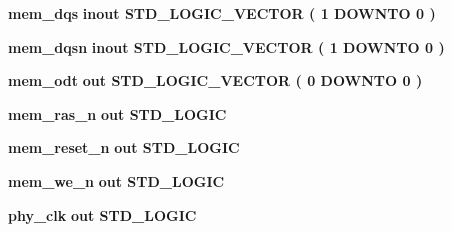 \begin{DoxyCompactItemize}
\item 
{\bf mem\+\_\+dqs}  {\bfseries {\bfseries \textcolor{keywordflow}{inout}\textcolor{vhdlchar}{ }}} {\bfseries \textcolor{comment}{S\+T\+D\+\_\+\+L\+O\+G\+I\+C\+\_\+\+V\+E\+C\+T\+OR}\textcolor{vhdlchar}{ }\textcolor{vhdlchar}{(}\textcolor{vhdlchar}{ }\textcolor{vhdlchar}{ } \textcolor{vhdldigit}{1} \textcolor{vhdlchar}{ }\textcolor{keywordflow}{D\+O\+W\+N\+TO}\textcolor{vhdlchar}{ }\textcolor{vhdlchar}{ } \textcolor{vhdldigit}{0} \textcolor{vhdlchar}{ }\textcolor{vhdlchar}{)}\textcolor{vhdlchar}{ }} 
\item 
{\bf mem\+\_\+dqsn}  {\bfseries {\bfseries \textcolor{keywordflow}{inout}\textcolor{vhdlchar}{ }}} {\bfseries \textcolor{comment}{S\+T\+D\+\_\+\+L\+O\+G\+I\+C\+\_\+\+V\+E\+C\+T\+OR}\textcolor{vhdlchar}{ }\textcolor{vhdlchar}{(}\textcolor{vhdlchar}{ }\textcolor{vhdlchar}{ } \textcolor{vhdldigit}{1} \textcolor{vhdlchar}{ }\textcolor{keywordflow}{D\+O\+W\+N\+TO}\textcolor{vhdlchar}{ }\textcolor{vhdlchar}{ } \textcolor{vhdldigit}{0} \textcolor{vhdlchar}{ }\textcolor{vhdlchar}{)}\textcolor{vhdlchar}{ }} 
\item 
{\bf mem\+\_\+odt}  {\bfseries {\bfseries \textcolor{keywordflow}{out}\textcolor{vhdlchar}{ }}} {\bfseries \textcolor{comment}{S\+T\+D\+\_\+\+L\+O\+G\+I\+C\+\_\+\+V\+E\+C\+T\+OR}\textcolor{vhdlchar}{ }\textcolor{vhdlchar}{(}\textcolor{vhdlchar}{ }\textcolor{vhdlchar}{ } \textcolor{vhdldigit}{0} \textcolor{vhdlchar}{ }\textcolor{keywordflow}{D\+O\+W\+N\+TO}\textcolor{vhdlchar}{ }\textcolor{vhdlchar}{ } \textcolor{vhdldigit}{0} \textcolor{vhdlchar}{ }\textcolor{vhdlchar}{)}\textcolor{vhdlchar}{ }} 
\item 
{\bf mem\+\_\+ras\+\_\+n}  {\bfseries {\bfseries \textcolor{keywordflow}{out}\textcolor{vhdlchar}{ }}} {\bfseries \textcolor{comment}{S\+T\+D\+\_\+\+L\+O\+G\+IC}\textcolor{vhdlchar}{ }} 
\item 
{\bf mem\+\_\+reset\+\_\+n}  {\bfseries {\bfseries \textcolor{keywordflow}{out}\textcolor{vhdlchar}{ }}} {\bfseries \textcolor{comment}{S\+T\+D\+\_\+\+L\+O\+G\+IC}\textcolor{vhdlchar}{ }} 
\item 
{\bf mem\+\_\+we\+\_\+n}  {\bfseries {\bfseries \textcolor{keywordflow}{out}\textcolor{vhdlchar}{ }}} {\bfseries \textcolor{comment}{S\+T\+D\+\_\+\+L\+O\+G\+IC}\textcolor{vhdlchar}{ }} 
\item 
{\bf phy\+\_\+clk}  {\bfseries {\bfseries \textcolor{keywordflow}{out}\textcolor{vhdlchar}{ }}} {\bfseries \textcolor{comment}{S\+T\+D\+\_\+\+L\+O\+G\+IC}\textcolor{vhdlchar}{ }} 
\item 

\end{DoxyCompactItemize}
